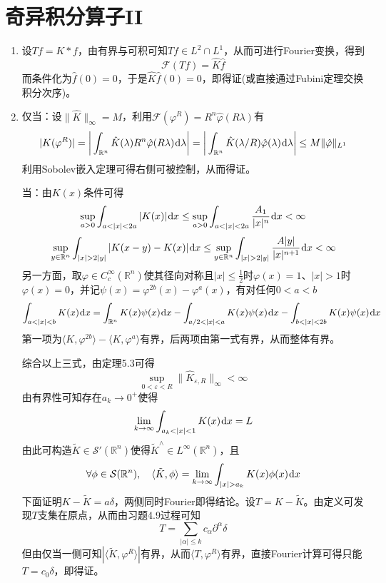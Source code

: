 \documentclass[a4paper,UTF8,fontset=windows]{ctexart}
\newcommand*{\dr}{\hspace{0.07em}\mathrm{d}}
\begin{document}
\section{奇异积分算子II}
\begin{enumerate}
    \item 设$Tf=K*f$，由有界与可积可知$Tf\in L^2\cap L^1$，从而可进行Fourier变换，得到
    $$\mathcal{F}(Tf)=\hat{K}\hat{f}$$
    而条件化为$\hat{f}(0)=0$，于是$\hat{K}\hat{f}(0)=0$，即得证(或直接通过Fubini定理交换积分次序)。

    \item
    仅当：设$\|\hat{K}\|_\infty=M$，利用$\mathcal{F}(\varphi^R)=R^n\hat{\varphi}(R\lambda)$有
    $$|K(\varphi^R)|=\bigg|\int_{\mathbb{R}^n}\hat{K}(\lambda)R^n\hat{\varphi}(R\lambda)\dr\lambda\bigg|=\bigg|\int_{\mathbb{R}^n}\hat{K}(\lambda/ R)\hat{\varphi}(\lambda)\dr\lambda\bigg|\le M\|\hat{\varphi}\|_{L^1}$$
    利用Sobolev嵌入定理可得右侧可被控制，从而得证。
    
    当：由$K(x)$条件可得
    $$\sup_{a>0}\int_{a<|x|<2a}|K(x)|\dr x\le\sup_{a>0}\int_{a<|x|<2a}\frac{A_1}{|x|^n}\dr x<\infty$$
    $$\sup_{y\in\mathbb{R}^n}\int_{|x|>2|y|}|K(x-y)-K(x)|\dr x\le\sup_{y\in\mathbb{R}^n}\int_{|x|>2|y|}\frac{A|y|}{|x|^{n+1}}\dr x<\infty$$
    另一方面，取$\varphi\in C_c^\infty(\mathbb{R}^n)$使其径向对称且$|x|\le\frac{1}{2}$时$\varphi(x)=1$、$|x|>1$时$\varphi(x)=0$，并记$\psi(x)=\varphi^{2b}(x)-\varphi^a(x)$，有对任何$0<a<b$
    $$\int_{a<|x|<b}K(x)\dr x=\int_{\mathbb{R}^n}K(x)\psi(x)\dr x-\int_{a/2<|x|<a}K(x)\psi(x)\dr x-\int_{b<|x|<2b}K(x)\psi(x)\dr x$$
    第一项为$\langle K,\varphi^{2b}\rangle-\langle K,\varphi^a\rangle$有界，后两项由第一式有界，从而整体有界。

    综合以上三式，由定理5.3可得
    $$\sup_{0<\varepsilon<R}\|\hat{K}_{\varepsilon,R}\|_\infty<\infty$$
    由有界性可知存在$a_k\to0^+$使得
    $$\lim_{k\to\infty}\int_{a_k<|x|<1}K(x)\dr x=L$$
    由此可构造$\tilde{K}\in\mathcal{S}'(\mathbb{R}^n)$使得$\tilde{K}^\wedge\in L^\infty(\mathbb{R}^n)$，且
    $$\forall\phi\in\mathcal{S}(\mathbb{R}^n),\quad\langle\tilde{K},\phi\rangle=\lim_{k\to\infty}\int_{|x|>a_k}K(x)\phi(x)\dr x$$
    下面证明$K-\tilde{K}=a\delta$，两侧同时Fourier即得结论。设$T=K-\tilde{K}$。由定义可发现$T$支集在原点，从而由习题4.9过程可知
    $$T=\sum_{|\alpha|\le k}c_\alpha\partial^\alpha\delta$$
    但由仅当一侧可知$|\langle\tilde{K},\varphi^R\rangle|$有界，从而$\langle T,\varphi^R\rangle$有界，直接Fourier计算可得只能$T=c_0\delta$，即得证。


\end{enumerate}
\end{document}
